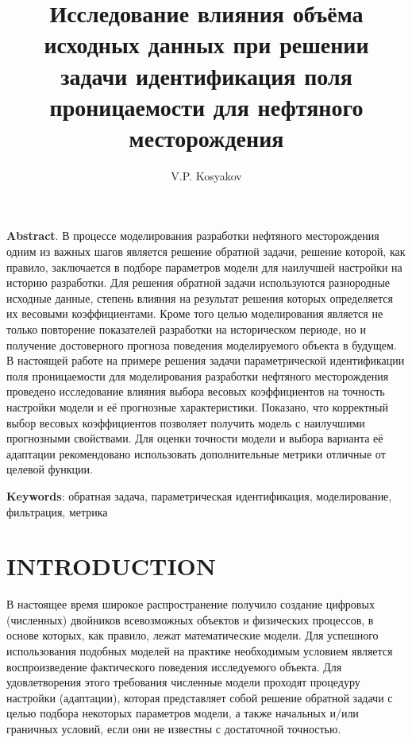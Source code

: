 \documentclass{article}
\title{Исследование влияния объёма исходных данных при решении задачи идентификация поля проницаемости для нефтяного месторождения}
\author{V.P. Kosyakov}
\begin{document}
	\maketitle
	\textbf{Abstract}. В процессе моделирования разработки нефтяного месторождения одним из важных шагов является решение обратной задачи, решение которой, как правило, заключается в подборе параметров модели для наилучшей настройки на историю разработки. Для решения обратной задачи используются разнородные исходные данные, степень влияния на результат решения которых определяется их весовыми коэффициентами. Кроме того целью моделирования является не только повторение показателей разработки на историческом периоде, но и получение достоверного прогноза поведения моделируемого объекта в будущем. 
	В настоящей  работе на примере решения задачи параметрической идентификации поля проницаемости для моделирования разработки нефтяного месторождения проведено исследование влияния выбора весовых коэффициентов на точность настройки модели и её прогнозные характеристики. Показано, что корректный выбор весовых коэффициентов позволяет получить модель с наилучшими прогнозными свойствами. Для оценки точности модели и выбора варианта её адаптации рекомендовано использовать дополнительные метрики отличные от целевой функции.

\textbf{Keywords}: обратная задача, параметрическая идентификация, моделирование, фильтрация, метрика

\section{INTRODUCTION}
	В настоящее время широкое распространение получило создание цифровых (численных) двойников всевозможных объектов и физических процессов, в основе которых, как правило, лежат математические модели. Для успешного использования подобных моделей на практике необходимым условием является воспроизведение фактического поведения исследуемого объекта. Для удовлетворения этого требования численные модели проходят процедуру настройки (адаптации), которая представляет собой решение обратной задачи с целью подбора некоторых параметров модели, а также начальных и/или граничных условий, если они не известны с достаточной точностью. 
	
\end{document}
